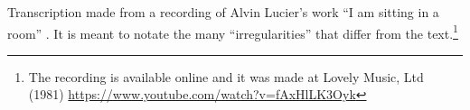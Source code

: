Transcription made from a recording of Alvin Lucier's work ``I am sitting in a room'' \parencite{Luc70:Iam}. It is meant to notate the many ``irregularities'' that differ from the text.\footnote{The recording is available online and it was made at Lovely Music, Ltd (1981) \url{https://www.youtube.com/watch?v=fAxHlLK3Oyk}} 
